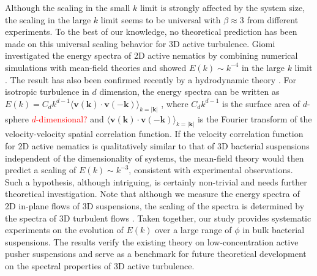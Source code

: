 \documentclass[twocolumn,aps,prx,amsmath,amssymb,longbibliography]{revtex4-2}
\begin{document}
Although the scaling in the small $k$ limit is strongly affected by the system size, the scaling in the large $k$ limit seems to be universal with $\beta \approx 3$ from different experiments. To the best of our knowledge, no theoretical prediction has been made on this universal scaling behavior for 3D active turbulence. Giomi investigated the energy spectra of 2D active nematics by combining numerical simulations with mean-field theories and showed $E(k) \sim k^{-4}$ in the large $k$ limit \cite{Giomi2015}.
The result has also been confirmed recently by a hydrodynamic theory \cite{Alert2020}. For isotropic turbulence in $d$ dimension, the energy spectra can be written as $E(k) = C_d k^{d-1} \langle \mathbf{v}(\mathbf{k})\cdot \mathbf{v}(-\mathbf{k})\rangle_{k = |\mathbf{k}|}$ \cite{Wensink2012,Bardfalvy2019},
where $C_d k^{d-1}$ is the surface area of $d$-sphere \textcolor{red}{$d$-dimensional?} and $\langle \mathbf{v}(\mathbf{k})\cdot \mathbf{v}(-\mathbf{k})\rangle_{k = |\mathbf{k}|}$ is the Fourier transform of the velocity-velocity spatial correlation function. If the velocity correlation function for 2D active nematics is qualitatively similar to that of 3D bacterial suspensions independent of the dimensionality of systems, the mean-field theory would then predict a scaling of $E(k) \sim k^{-3}$, consistent with experimental observations. Such a hypothesis, although intriguing, is certainly non-trivial and needs further theoretical investigation. Note that although we measure the energy spectra of 2D in-plane flows of 3D suspensions, the scaling of the spectra is determined by the spectra of 3D turbulent flows \cite{Pope2000}. Taken together, our study provides systematic experiments on the evolution of $E(k)$ over a large range of $\phi$ in bulk bacterial suspensions. The results verify the existing theory on low-concentration active pusher suspensions and serve as a benchmark for future theoretical development on the spectral properties of 3D active turbulence.
\end{document}
